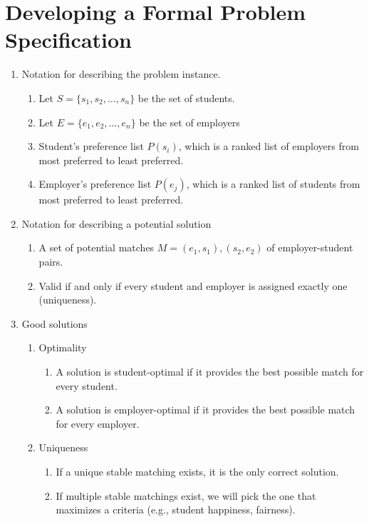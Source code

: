 \documentclass[12pt]{article}
\begin{document}
\section{Developing a Formal Problem Specification}
   \begin{enumerate}
    \item Notation for describing the problem instance.
        \begin{enumerate}
            \item Let $S = \{s_1, s_2, \ldots, s_n\}$ 
            be the set of students.
            \item Let $E = \{e_1, e_2, \ldots, e_n\}$ be 
            the set of employers 
            \item Student's preference list $P(s_i)$, which is a ranked 
            list of employers from most preferred to least preferred.
            \item Employer's preference list $P(e_j)$, which is a ranked
            list of students from most preferred to least preferred.
        \end{enumerate}
    \item Notation for describing a potential solution
        \begin{enumerate}
            \item A set of potential matches $M = {(e_1, s_1), (s_2, e_2)}$ 
            of employer-student pairs.
            \item Valid if and only if every student and employer is assigned exactly one (uniqueness).
        \end{enumerate}
    \item Good solutions
        \begin{enumerate}
            \item Optimality
                \begin{enumerate}
                    \item A solution is student-optimal if it provides the best possible match for every student.
                    \item A solution is employer-optimal if it provides the best possible match for every employer.
                \end{enumerate}
            \item Uniqueness
                \begin{enumerate}
                    \item If a unique stable matching exists, it is the only correct solution.
                    \item If multiple stable matchings exist, we will pick the one that maximizes a criteria (e.g., student happiness, fairness).

\end{enumerate}
\end{enumerate}
\end{enumerate}
\end{document}
